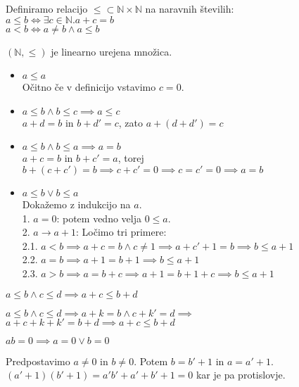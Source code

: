 \begin{definicija}
    Definiramo relacijo $\leq \subset \mathbb{N} \times \mathbb{N}$ na naravnih številih: \\
    $a \leq b \iff \exists c \in \mathbb{N}. a + c = b$ \\
    $a < b \iff a \neq b \wedge a \leq b$
\end{definicija}

\begin{trditev}
    $(\mathbb{N}, \leq)$ je linearno urejena množica.
\end{trditev}
\begin{dokaz}
    \begin{itemize}
        \item $a \leq a$ \\
        Očitno če v definicijo vstavimo $c = 0$.
        \item $a \leq b \wedge b \leq c \implies a \leq c$ \\
        $a + d = b$ in $b + d' = c$, zato $a + (d + d') = c$
        \item $a \leq b \wedge b \leq a \implies a = b$ \\
        $a + c = b$ in $b + c' = a$, torej $b + (c + c') = b \implies c + c' = 0 \implies c = c' = 0 \implies a = b$
        \item $a \leq b \vee b \leq a$ \\
        Dokažemo z indukcijo na $a$. \\
        1. $a = 0$: potem vedno velja $0 \leq a$. \\
        2. $a \to a + 1$: Ločimo tri primere: \\
        2.1. $a < b \implies a + c = b \wedge c \neq 1 \implies a + c' + 1 = b \implies b \leq a + 1$ \\
        2.2. $a = b \implies a + 1 = b + 1 \implies b \leq a + 1$ \\
        2.3. $a > b \implies a = b + c \implies a + 1 = b + 1 + c \implies b \leq a + 1$
    \end{itemize}
\end{dokaz}

\begin{trditev}
    $a \leq b \wedge c \leq d \implies a + c \leq b + d$
\end{trditev}
\begin{dokaz}
    $a \leq b \wedge c \leq d \implies a + k = b \wedge c + k' = d \implies$
    $a + c + k + k' = b + d \implies a + c \leq b + d$
\end{dokaz}

\begin{trditev}
    $ab = 0 \implies a = 0 \vee b = 0$
\end{trditev}
\begin{dokaz}
    Predpostavimo $a \neq 0$ in $b \neq 0$.
    Potem $b = b' + 1$ in $a = a' + 1$.
    $(a' + 1)(b' + 1) = a'b' + a' + b' + 1 = 0$ kar je pa protislovje.
\end{dokaz}

